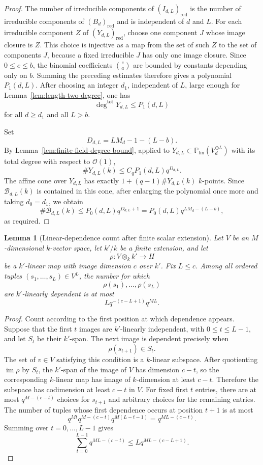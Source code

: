 \documentclass{lms}
\newtheorem{lemma}[theorem]{Lemma}
\DeclareMathOperator{\im}{im}
\newcommand{\PP}{\mathbb P}
\newcommand{\OO}{\mathcal O}
\begin{document}
\begin{proof}
The number of irreducible components of $(I_{d,L})_{\mathrm{red}}$ is the number of irreducible components of $(B_d)_{\mathrm{red}}$ and is independent of $d$ and $L$.  For each irreducible component $Z$ of $(Y_{d,L})_{\mathrm{red}}$, choose one component $J$ whose image closure is $Z$.  This choice is injective as a map from the set of such $Z$ to the set of components $J$, because a fixed irreducible $J$ has only one image closure.  Since $0\le e\le b$, the binomial coefficients $\binom ea$ are bounded by constants depending only on $b$.  Summing the preceding estimates therefore gives a polynomial $P_1(d,L)$.  After choosing an integer $d_1$, independent of $L$, large enough for Lemma~\ref{lem:length-two-degree}, one has
\[
        \deg^{\mathrm{tot}}Y_{d,L}\le P_1(d,L)
\]
for all $d\ge d_1$ and all $L>b$.

Set
\[
        D_{d,L}=LM_d-1-(L-b).
\]
By Lemma~\ref{lem:finite-field-degree-bound}, applied to $Y_{d,L}\subset\PP_{\mathrm{lin}}(V_d^{\oplus L})$ with its total degree with respect to $\OO(1)$,
\[
        \#Y_{d,L}(k)
        \le C_qP_1(d,L)q^{D_{d,L}}.
\]
The affine cone over $Y_{d,L}$ has exactly $1+(q-1)\#Y_{d,L}(k)$ $k$-points.  Since $\mathcal B_{d,L}(k)$ is contained in this cone, after enlarging the polynomial once more and taking $d_0=d_1$, we obtain
\[
        \#\mathcal B_{d,L}(k)
        \le
        P_0(d,L)q^{D_{d,L}+1}
        =P_0(d,L)q^{LM_d-(L-b)},
\]
as required.
\end{proof}

\begin{lemma}[Linear-dependence count after finite scalar extension]\label{lem:extension-dependence-count}
Let $V$ be an $M$-dimensional $k$-vector space, let $k'/k$ be a finite extension, and let
\[
        \rho:V\otimes_k k'\longrightarrow H
\]
be a $k'$-linear map with image dimension $c$ over $k'$.  Fix $L\le c$.  Among all ordered tuples $(s_1,\ldots,s_L)\in V^L$, the number for which
\[
        \rho(s_1),\ldots,\rho(s_L)
\]
are $k'$-linearly dependent is at most
\[
        Lq^{-(c-L+1)}q^{ML}.
\]
\end{lemma}

\begin{proof}
Count according to the first position at which dependence appears.  Suppose that the first $t$ images are $k'$-linearly independent, with $0\le t\le L-1$, and let $S_t$ be their $k'$-span.  The next image is dependent precisely when
\[
        \rho(s_{t+1})\in S_t.
\]
The set of $v\in V$ satisfying this condition is a $k$-linear subspace.  After quotienting $\im\rho$ by $S_t$, the $k'$-span of the image of $V$ has dimension $c-t$, so the corresponding $k$-linear map has image of $k$-dimension at least $c-t$.  Therefore the subspace has codimension at least $c-t$ in $V$.  For fixed first $t$ entries, there are at most $q^{M-(c-t)}$ choices for $s_{t+1}$ and arbitrary choices for the remaining entries.  The number of tuples whose first dependence occurs at position $t+1$ is at most
\[
        q^{Mt}q^{M-(c-t)}q^{M(L-t-1)}=q^{ML-(c-t)}.
\]
Summing over $t=0,\ldots,L-1$ gives
\[
        \sum_{t=0}^{L-1}q^{ML-(c-t)}
        \le Lq^{ML-(c-L+1)}.
\]
\end{proof}
\end{document}
